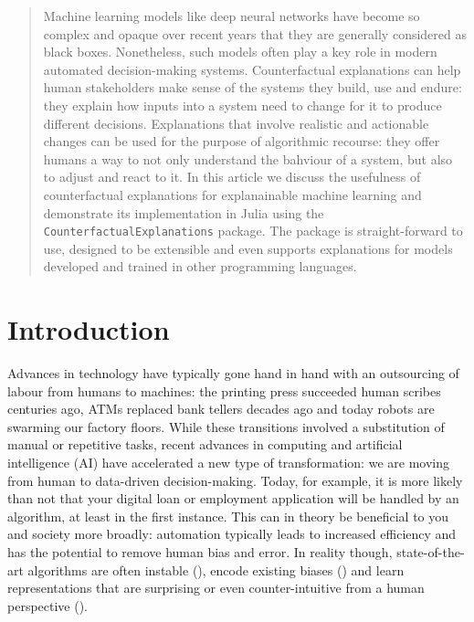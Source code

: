 \documentclass{juliacon}
\begin{document}


\maketitle

\begin{abstract}

Machine learning models like deep neural networks have become so complex and opaque over recent years that they are generally considered as black boxes. Nonetheless, such models often play a key role in modern automated decision-making systems. Counterfactual explanations can help human stakeholders make sense of the systems they build, use and endure: they explain how inputs into a system need to change for it to produce different decisions. Explanations that involve realistic and actionable changes can be used for the purpose of algorithmic recourse: they offer humans a way to not only understand the bahviour of a system, but also to adjust and react to it. In this article we discuss the usefulness of counterfactual explanations for explanainable machine learning and demonstrate its implementation in Julia using the \verb|CounterfactualExplanations| package. The package is straight-forward to use, designed to be extensible and even supports explanations for models developed and trained in other programming languages.

\end{abstract}

\hypertarget{sec-intro}{%
\section{Introduction}\label{sec-intro}}

Advances in technology have typically gone hand in hand with an
outsourcing of labour from humans to machines: the printing press
succeeded human scribes centuries ago, ATMs replaced bank tellers
decades ago and today robots are swarming our factory floors. While
these transitions involved a substitution of manual or repetitive tasks,
recent advances in computing and artificial intelligence (AI) have
accelerated a new type of transformation: we are moving from human to
data-driven decision-making. Today, for example, it is more likely than
not that your digital loan or employment application will be handled by
an algorithm, at least in the first instance. This can in theory be
beneficial to you and society more broadly: automation typically leads
to increased efficiency and has the potential to remove human bias and
error. In reality though, state-of-the-art algorithms are often instable
(\cite{goodfellow2014explaining}), encode existing biases
(\cite{buolamwini2018gender}) and learn representations that are
surprising or even counter-intuitive from a human perspective
(\cite{sturm2014simple}).
\end{document}

